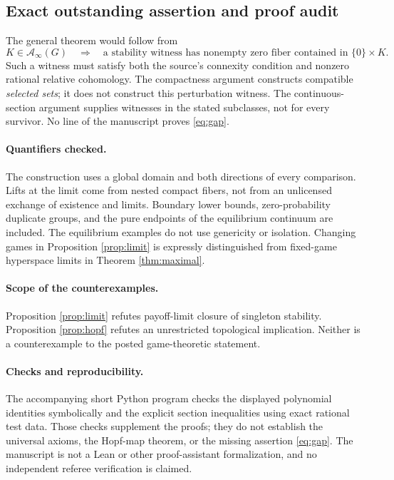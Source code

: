 \documentclass[11pt]{article}
\theoremstyle{definition}
\newcommand{\A}{\mathcal A}
\begin{document}
\subsection{Exact outstanding assertion and proof audit}\label{sec:gap}
The general theorem would follow from
\begin{equation}\label{eq:gap}
 K\in\A_\infty(G)\quad\Longrightarrow\quad
 \text{a stability witness has nonempty zero fiber contained in }\{0\}\times K.
\end{equation}
Such a witness must satisfy both the source's connexity condition and nonzero
rational relative cohomology. The compactness argument constructs compatible
\emph{selected sets}; it does not construct this perturbation witness.
The continuous-section argument supplies witnesses in the stated subclasses,
not for every survivor. No line of the manuscript proves \eqref{eq:gap}.

\paragraph{Quantifiers checked.}
The construction uses a global domain and both directions of every comparison.
Lifts at the limit come from nested compact fibers, not from an unlicensed
exchange of existence and limits. Boundary lower bounds, zero-probability
duplicate groups, and the pure endpoints of the equilibrium continuum are
included. The equilibrium examples do not use genericity or isolation.
Changing games in Proposition \ref{prop:limit} is expressly distinguished
from fixed-game hyperspace limits in Theorem \ref{thm:maximal}.

\paragraph{Scope of the counterexamples.}
Proposition \ref{prop:limit} refutes payoff-limit closure of singleton stability.
Proposition \ref{prop:hopf} refutes an unrestricted topological implication.
Neither is a counterexample to the posted game-theoretic statement.

\paragraph{Checks and reproducibility.}
The accompanying short Python program checks the displayed polynomial
identities symbolically and the explicit section inequalities using exact
rational test data. Those checks supplement the proofs; they do not establish
the universal axioms, the Hopf-map theorem, or the missing assertion
\eqref{eq:gap}. The manuscript is not a Lean or other proof-assistant
formalization, and no independent referee verification is claimed.
\end{document}
